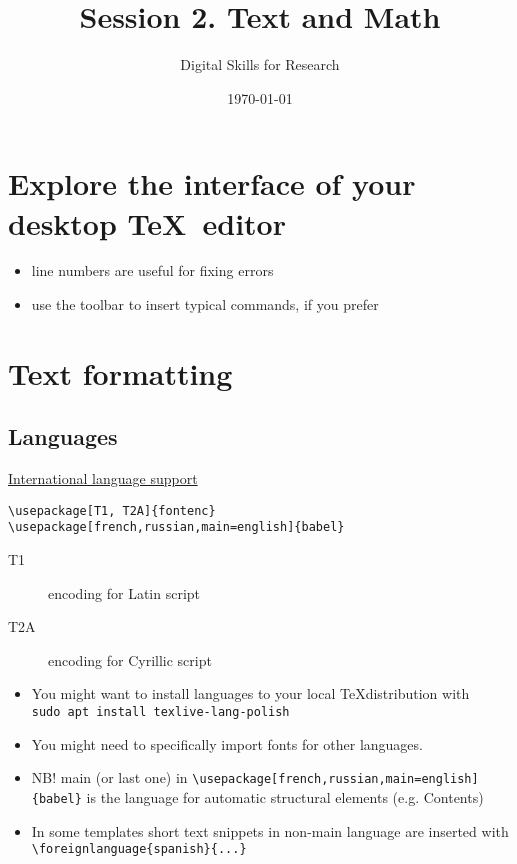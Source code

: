 \documentclass[a4paper,11pt]{article}
\title{Session 2. Text and Math}
\author{Digital Skills for Research}
\date{\today}
\begin{document}
\maketitle
\tableofcontents

\section{Explore the interface of your desktop \TeX~editor}

\begin{itemize}
	\item line numbers are useful for fixing errors
	\item use the toolbar to insert typical commands, if you prefer
\end{itemize}

\section{Text formatting}

\subsection{Languages}

 \href{https://www.overleaf.com/learn/latex/International_language_support}{International language support}

\begin{lstlisting}[breaklines]
\usepackage[T1, T2A]{fontenc}
\usepackage[french,russian,main=english]{babel}
\end{lstlisting}

\begin{description}
	\item[T1] encoding for Latin script
	\item[T2A] encoding for Cyrillic script
\end{description}

\begin{itemize}
	\item You might want to install languages to your local \TeX distribution with \\ \verb|sudo apt install texlive-lang-polish|
	\item You might need to specifically import fonts for other languages.
	\item NB! main (or last one) in \verb|\usepackage[french,russian,main=english]{babel}| is the language for automatic structural elements (e.g. Contents)
	\item In some templates short text snippets in non-main language are inserted with
	\verb|\foreignlanguage{spanish}{...}| 
\end{itemize}
\end{document}

